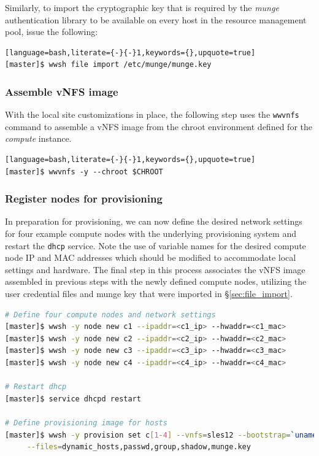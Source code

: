 \documentclass[letterpaper]{article}
\begin{document}
Similarly, to import the cryptographic key that is required by the {\em munge}
authentication library to be available on every host in the resource management
pool, issue the following:

\begin{lstlisting}[language=bash,literate={-}{-}1,keywords={},upquote=true]
[master]$ wwsh file import /etc/munge/munge.key
\end{lstlisting}


\subsubsection{Assemble vNFS image}

With the local site customizations in place, the following step uses the
\texttt{wwvnfs} command to assemble a vNFS image from the chroot environment
defined for the {\em compute} instance. 

\begin{lstlisting}[language=bash,literate={-}{-}1,keywords={},upquote=true]
[master]$ wwvnfs -y --chroot $CHROOT
\end{lstlisting}

\subsubsection{Register nodes for provisioning}

In preparation for provisioning, we can now define the desired network settings
for four example compute nodes with the underlying provisioning system and
restart the \texttt{dhcp} service. Note the use of variable names for the
desired compute node IP and MAC addresses which should be modified to
accommodate local settings and hardware. The final step in this process
associates the vNFS image assembled in previous steps with the newly defined
compute nodes, utilizing the user credential files and munge key that were
imported in \S\ref{sec:file_import}.


\begin{lstlisting}[language=bash,keywords={},upquote=true,basicstyle=\footnotesize\ttfamily]
# Define four compute nodes and network settings 
[master]$ wwsh -y node new c1 --ipaddr=<c1_ip> --hwaddr=<c1_mac> 
[master]$ wwsh -y node new c2 --ipaddr=<c2_ip> --hwaddr=<c2_mac> 
[master]$ wwsh -y node new c3 --ipaddr=<c3_ip> --hwaddr=<c3_mac> 
[master]$ wwsh -y node new c4 --ipaddr=<c4_ip> --hwaddr=<c4_mac> 

# Restart dhcp 
[master]$ service dhcpd restart

# Define provisioning image for hosts
[master]$ wwsh -y provision set c[1-4] --vnfs=sles12 --bootstrap=`uname -r` \
     --files=dynamic_hosts,passwd,group,shadow,munge.key 
\end{lstlisting}
\end{document}
